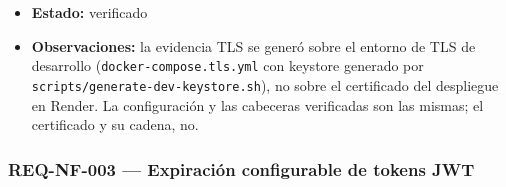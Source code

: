 \documentclass[
  spanish,
]{article}
\begin{document}
\begin{itemize}
  \texttt{.\allowbreak{}headers(...)}), \texttt{Tomcat\allowbreak{}Dual\allowbreak{}Connector\allowbreak{}Config} (conector
  dual HTTP/HTTPS),
  \texttt{Backend/\allowbreak{}src/\allowbreak{}main/\allowbreak{}resources/\allowbreak{}application-\allowbreak{}tls.\allowbreak{}yml},
  \texttt{docker-\allowbreak{}compose.\allowbreak{}tls.\allowbreak{}yml},
  \texttt{scripts/\allowbreak{}generate-\allowbreak{}dev-\allowbreak{}keystore.\allowbreak{}sh},
  \texttt{docs/\allowbreak{}despliegue/\allowbreak{}Caddyfile} y \texttt{nginx-\allowbreak{}render.\allowbreak{}conf};
  validación documentada en
  \texttt{docs/\allowbreak{}despliegue/\allowbreak{}VALIDACION-\allowbreak{}HEADERS-\allowbreak{}Z4.\allowbreak{}md}; prueba
  \texttt{Backend/\allowbreak{}src/\allowbreak{}test/\allowbreak{}java/\allowbreak{}com/\allowbreak{}biopet/\allowbreak{}Security\allowbreak{}Headers\allowbreak{}Test.\allowbreak{}java}.
\item
  \textbf{Estado:} verificado
\item
  \textbf{Observaciones:} la evidencia TLS se generó sobre el entorno de
  TLS de desarrollo (\texttt{docker-\allowbreak{}compose.\allowbreak{}tls.\allowbreak{}yml} con keystore
  generado por \texttt{scripts/\allowbreak{}generate-\allowbreak{}dev-\allowbreak{}keystore.\allowbreak{}sh}), no sobre el
  certificado del despliegue en Render. La configuración y las cabeceras
  verificadas son las mismas; el certificado y su cadena, no.
\end{itemize}

\subsubsection{REQ-NF-003 --- Expiración configurable de tokens
JWT}\label{req-nf-003-expiraciuxf3n-configurable-de-tokens-jwt}
\end{document}

